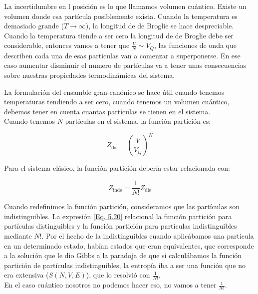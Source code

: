 \documentclass[11pt,fleqn]{book}
\begin{document}

La incertidumbre en l posición es lo que llamamos volumen cuántico. Existe un volumen donde esa partícula posiblemente exista. Cuando la temperatura es demasiado grande ($T\longrightarrow\infty$), la longitud de de Broglie se hace despreciable. Cuando la temperatura tiende a ser cero la longitud de de Broglie debe ser considerable, entonces vamos a tener que $\frac{V}{N}\sim V_{Q}$, las funciones de onda que describen cada una de esas partículas van a comenzar a superponerse. En ese caso aumentar  disminuir el numero de partículas va a tener unas consecuencias sobre nuestras propiedades termodinámicas del sistema.



La formulación del ensamble gran-canónico se hace útil cuando tenemos temperaturas tendiendo a ser cero, cuando tenemos un volumen cuántico, debemos tener en cuenta cuantas partículas se tienen en el sistema.\\

Cuando tenemos $N$ partículas en el sistema, la función partición es:

\begin{equation*}
    Z_{\text{dis}}=\left(\frac{V}{V_{Q}}\right)^{N}
\end{equation*}

Para el sistema clásico, la función partición debería estar  relacionada con:

\begin{equation}
    Z_{\text{inds}}=\frac{1}{N!}Z_{\text{dis}}
    \label{Eq. 5.20}
\end{equation}

Cuando redefinimos la función partición, consideramos que las partículas son indistinguibles. La expresión \ref{Eq. 5.20} relacional la función partición para partículas distinguibles y la función partición para partículas indistinguibles mediante $N!$. Por el hecho de la indistinguibles cuando aplicábamos una partícula en un determinado estado, habían estados que eran equivalentes, que corresponde a la solución que le dio Gibbs a la paradoja de que si calculábamos la función partición de partículas indistinguibles, la entropía iba a ser una función que no era extensiva ($S(N, V, E)$), que lo resolvió con $\frac{1}{N!}$.\\

En el caso cuántico nosotros no podemos hacer eso, no vamos a tener $\frac{1}{N!}$. 
\end{document}
